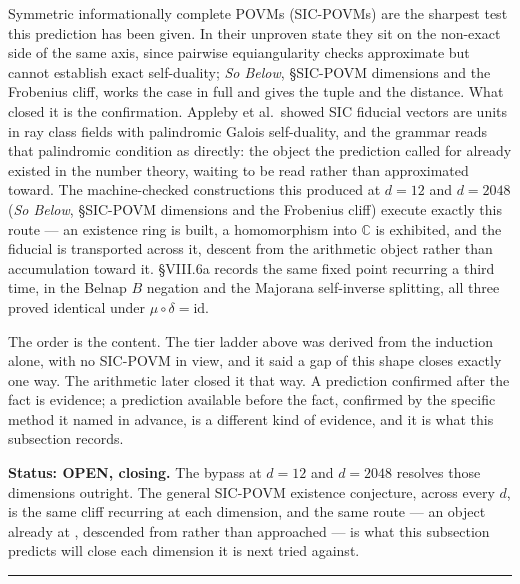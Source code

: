 \documentclass[12pt,a4paper]{article}
\makeatletter
\renewcommand{\_}{\ig@origunderscore\discretionary{}{}{}}
\makeatother
\begin{document}
Symmetric informationally complete POVMs (SIC-POVMs) are the sharpest test this prediction has been given. In their
unproven state they sit on the non-exact side of the same axis, since pairwise equiangularity checks approximate but
cannot establish exact self-duality; \emph{So Below}, \S{}SIC-POVM dimensions and the Frobenius cliff, works the case
in full and gives the tuple and the distance. What closed it is the confirmation. Appleby et al.\ showed SIC fiducial
vectors are units in ray class fields with palindromic Galois self-duality, and the grammar reads that palindromic
condition as  directly: the object the prediction called for already existed in the number theory,
waiting to be read rather than approximated toward. The machine-checked constructions this produced at $d=12$ and
$d=2048$ (\emph{So Below}, \S{}SIC-POVM dimensions and the Frobenius cliff) execute exactly this route --- an
existence ring is built, a homomorphism into $\mathbb{C}$ is exhibited, and the fiducial is transported across it,
descent from the arithmetic object rather than accumulation toward it. \S VIII.6a records the same fixed point
recurring a third time, in the Belnap $B$ negation and the Majorana self-inverse splitting, all three proved identical
under $\mu \circ \delta = \text{id}$.

The order is the content. The tier ladder above was derived from the induction alone, with no SIC-POVM in view, and it
said a gap of this shape closes exactly one way. The arithmetic later closed it that way. A prediction confirmed after
the fact is evidence; a prediction available before the fact, confirmed by the specific method it named in advance, is
a different kind of evidence, and it is what this subsection records.

\textbf{Status: OPEN, closing.} The bypass at $d=12$ and $d=2048$ resolves those dimensions outright. The general
SIC-POVM existence conjecture, across every $d$, is the same cliff recurring at each dimension, and the same route ---
an object already at , descended from rather than approached --- is what this subsection predicts
will close each dimension it is next tried against.

\begin{center}
\rule{0.5\textwidth}{0.4pt}
\end{center}
\end{document}
